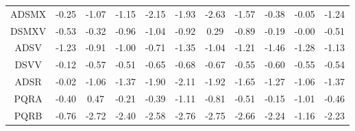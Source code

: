 \begin{longtable}{ | c || c | c | c | c | c | c | c | c | c || c |}
ADSMX &  \cellcolor[HTML]{FFF7F7} -0.25 &  \cellcolor[HTML]{FFE7E7} -1.07 &  \cellcolor[HTML]{FFDFDF} -1.15 &  \cellcolor[HTML]{FFC7C7} -2.15 &  \cellcolor[HTML]{FFCFCF} -1.93 &  \cellcolor[HTML]{FFBFBF} -2.63 &  \cellcolor[HTML]{FFD7D7} -1.57 &  \cellcolor[HTML]{FFF7F7} -0.38 &  \cellcolor[HTML]{FFFFFF} -0.05 &  \cellcolor[HTML]{FFDFDF} -1.24 \\
DSMXV &  \cellcolor[HTML]{FFEFEF} -0.53 &  \cellcolor[HTML]{FFF7F7} -0.32 &  \cellcolor[HTML]{FFE7E7} -0.96 &  \cellcolor[HTML]{FFE7E7} -1.04 &  \cellcolor[HTML]{FFE7E7} -0.92 &  \cellcolor[HTML]{F7F7FF} 0.29 &  \cellcolor[HTML]{FFE7E7} -0.89 &  \cellcolor[HTML]{FFF7F7} -0.19 &  \cellcolor[HTML]{FFFFFF} -0.00 &  \cellcolor[HTML]{FFEFEF} -0.51 \\
ADSV &  \cellcolor[HTML]{FFDFDF} -1.23 &  \cellcolor[HTML]{FFE7E7} -0.91 &  \cellcolor[HTML]{FFE7E7} -1.00 &  \cellcolor[HTML]{FFEFEF} -0.71 &  \cellcolor[HTML]{FFDFDF} -1.35 &  \cellcolor[HTML]{FFE7E7} -1.04 &  \cellcolor[HTML]{FFDFDF} -1.21 &  \cellcolor[HTML]{FFD7D7} -1.46 &  \cellcolor[HTML]{FFDFDF} -1.28 &  \cellcolor[HTML]{FFDFDF} -1.13 \\
DSVV &  \cellcolor[HTML]{FFFFFF} -0.12 &  \cellcolor[HTML]{FFEFEF} -0.57 &  \cellcolor[HTML]{FFEFEF} -0.51 &  \cellcolor[HTML]{FFEFEF} -0.65 &  \cellcolor[HTML]{FFEFEF} -0.68 &  \cellcolor[HTML]{FFEFEF} -0.67 &  \cellcolor[HTML]{FFEFEF} -0.55 &  \cellcolor[HTML]{FFEFEF} -0.60 &  \cellcolor[HTML]{FFEFEF} -0.55 &  \cellcolor[HTML]{FFEFEF} -0.54 \\
ADSR &  \cellcolor[HTML]{FFFFFF} -0.02 &  \cellcolor[HTML]{FFE7E7} -1.06 &  \cellcolor[HTML]{FFDFDF} -1.37 &  \cellcolor[HTML]{FFCFCF} -1.90 &  \cellcolor[HTML]{FFC7C7} -2.11 &  \cellcolor[HTML]{FFCFCF} -1.92 &  \cellcolor[HTML]{FFD7D7} -1.65 &  \cellcolor[HTML]{FFDFDF} -1.27 &  \cellcolor[HTML]{FFE7E7} -1.06 &  \cellcolor[HTML]{FFDFDF} -1.37 \\
PQRA &  \cellcolor[HTML]{FFF7F7} -0.40 &  \cellcolor[HTML]{F7F7FF} 0.47 &  \cellcolor[HTML]{FFF7F7} -0.21 &  \cellcolor[HTML]{FFF7F7} -0.39 &  \cellcolor[HTML]{FFDFDF} -1.11 &  \cellcolor[HTML]{FFE7E7} -0.81 &  \cellcolor[HTML]{FFEFEF} -0.51 &  \cellcolor[HTML]{FFFFFF} -0.15 &  \cellcolor[HTML]{FFE7E7} -1.01 &  \cellcolor[HTML]{FFF7F7} -0.46 \\
PQRB &  \cellcolor[HTML]{FFEFEF} -0.76 &  \cellcolor[HTML]{FFB7B7} -2.72 &  \cellcolor[HTML]{FFBFBF} -2.40 &  \cellcolor[HTML]{FFBFBF} -2.58 &  \cellcolor[HTML]{FFB7B7} -2.76 &  \cellcolor[HTML]{FFB7B7} -2.75 &  \cellcolor[HTML]{FFBFBF} -2.66 &  \cellcolor[HTML]{FFC7C7} -2.24 &  \cellcolor[HTML]{FFDFDF} -1.16 &  \cellcolor[HTML]{FFC7C7} -2.23 \\

\end{longtable}

